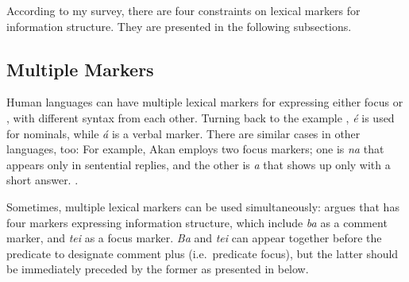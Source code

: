 According to my survey, there are four constraints on lexical markers
for information structure. They are presented in the following
subsections.



\subsection{Multiple Markers}
\label{4:ssec:multiple}

Human languages can have multiple lexical markers for expressing
either focus or , with different syntax from each other. Turning
back to the  example , \textit{{\'e}} is
used for nominals, while \textit{{\'a}} is a verbal 
marker. There are similar cases in other languages, too: For example,
Akan employs two focus markers; one is \textit{na} that appears only
in sentential replies, and the other is \textit{a} that shows up only
with a short answer.  \citep[p.\ 4]{drubig:03}.





Sometimes, multiple lexical markers can be used
simultaneously: \citet{schneider:09} argues that
 has four markers expressing information structure, which
include \textit{ba} as a comment marker, and \textit{tei} as a focus
marker.  \textit{Ba} and \textit{tei} can appear together before the
predicate to designate comment plus  (i.e.\ predicate focus), but
the latter should be immediately preceded by the former as presented
in  below.






